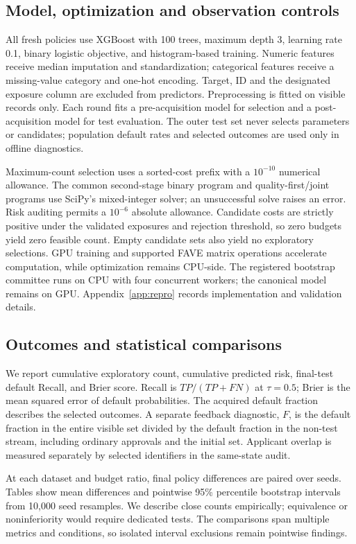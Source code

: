 \subsection{Model, optimization and observation controls}
All fresh policies use XGBoost with 100 trees, maximum depth 3, learning rate 0.1, binary logistic objective, and histogram-based training. Numeric features receive median imputation and standardization; categorical features receive a missing-value category and one-hot encoding. Target, ID and the designated exposure column are excluded from predictors. Preprocessing is fitted on visible records only. Each round fits a pre-acquisition model for selection and a post-acquisition model for test evaluation. The outer test set never selects parameters or candidates; population default rates and selected outcomes are used only in offline diagnostics.

Maximum-count selection uses a sorted-cost prefix with a $10^{-10}$ numerical allowance. The common second-stage binary program and quality-first/joint programs use SciPy's mixed-integer solver; an unsuccessful solve raises an error. Risk auditing permits a $10^{-6}$ absolute allowance. Candidate costs are strictly positive under the validated exposures and rejection threshold, so zero budgets yield zero feasible count. Empty candidate sets also yield no exploratory selections. GPU training and supported FAVE matrix operations accelerate computation, while optimization remains CPU-side. The registered bootstrap committee runs on CPU with four concurrent workers; the canonical model remains on GPU. Appendix~\ref{app:repro} records implementation and validation details.

\subsection{Outcomes and statistical comparisons}
We report cumulative exploratory count, cumulative predicted risk, final-test default Recall, and Brier score. Recall is $TP/(TP+FN)$ at $\tau=0.5$; Brier is the mean squared error of default probabilities. The acquired default fraction describes the selected outcomes. A separate feedback diagnostic, $F$, is the default fraction in the entire visible set divided by the default fraction in the non-test stream, including ordinary approvals and the initial set. Applicant overlap is measured separately by selected identifiers in the same-state audit.

At each dataset and budget ratio, final policy differences are paired over seeds. Tables show mean differences and pointwise 95\% percentile bootstrap intervals from 10,000 seed resamples. We describe close counts empirically; equivalence or noninferiority would require dedicated tests. The comparisons span multiple metrics and conditions, so isolated interval exclusions remain pointwise findings.

